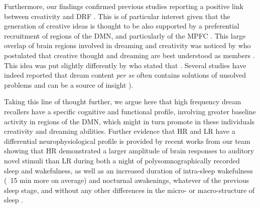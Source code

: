 Furthermore, our findings confirmed previous studies reporting a positive link between creativity and DRF \citep{fitch_variations_1989, schredl_creativity_1995, schredl_factors_2003}. This is of particular interest given that the generation of creative ideas is thought to be also supported by a preferential recruitment of regions of the DMN, and particularly of the MPFC \citep{dietrich_review_2010, ellamil_evaluative_2012, jung_structure_2013, beaty_creativity_2014, mok_interplay_2014, beaty_default_2015}. This large overlap of brain regions involved in dreaming and creativity was noticed by \citet{christoff_mind-wandering_2016} who postulated that creative thought and dreaming are best understood as members . This idea was put slightly differently by \citet{barrett_dreams_2017} who stated that . Several studies have indeed reported that dream content \emph{per se} often contains solutions of unsolved problems and can be a source of insight \citep{dement_relation_1957, barrett__1993, maquet_psychology:_2004, edwards_dreaming_2013}).

Taking this line of thought further, we argue here that high frequency dream recallers have a specific cognitive and functional profile, involving greater baseline activity in regions of the DMN, which might in turn promote in these individuals creativity and dreaming abilities. Further evidence that HR and LR have a differential neurophysiological profile is provided by recent works from our team showing that HR demonstrated a larger amplitude of brain responses to auditory novel stimuli than LR during both a night of polysomnographically recorded sleep and wakefulness, as well as an increased duration of intra-sleep wakefulness (~15 min more on average) and nocturnal awakenings, whatever of the previous sleep stage, and without any other differences in the micro- or macro-structure of sleep \citep{eichenlaub_brain_2014, vallat_increased_2017}.

